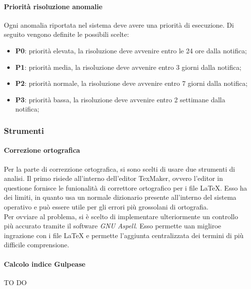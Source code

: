 			\paragraph{Priorità risoluzione anomalie}
			\label{par:priorita_risoluzione_anomalie}
			Ogni anomalia riportata nel sistema deve avere una priorità di esecuzione. Di seguito vengono definite le possibili scelte:
			\begin{itemize}
				\item \textbf{P0}: priorità elevata, la risoluzione deve avvenire entro le 24 ore dalla notifica; 
				\item \textbf{P1}: priorità media, la risoluzione deve avvenire entro 3 giorni dalla notifica;
				\item \textbf{P2}: priorità normale, la risoluzione deve avvenire entro 7 giorni dalla notifica;
				\item \textbf{P3}: priorità bassa, la risoluzione deve avvenire entro 2 settimane dalla notifica;
			\end{itemize}


		\subsubsection{Strumenti} %
		\label{ssub:strumenti}
			\paragraph{Correzione ortografica} %
			\label{par:correzione_ortografica}
			Per la parte di correzzione ortografica, si sono scelti di usare due strumenti di analisi. Il primo risiede all'interno dell'editor TexMaker, ovvero l'editor in questione fornisce le funionalità di correttore ortografico per i file \LaTeX. Esso ha dei limiti, in quanto usa un normale dizionario presente all'interno del sistema operativo e può essere utile per gli errori più grossolani di ortografia.\\
			Per ovviare al problema, si è scelto di implementare ulteriormente un controllo più accurato tramite il software \emph{GNU Aspell}. Esso permette uan migliroe ingrazione con i file \LaTeX{} e permette l'aggiunta centralizzata dei termini di più difficile comprensione.
			
			\paragraph{Calcolo indice Gulpease} %
			\label{par:calcolo_indice_gulpease}
			TO DO



